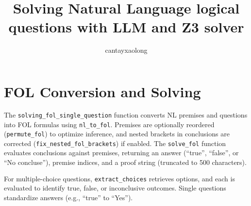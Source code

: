 \documentclass[11pt]{article}
\title{Solving Natural Language logical questions with LLM and Z3 solver}
\author{cantayxaolong}
\date{}
\begin{document}
\maketitle
\footnotesize

\section{FOL Conversion and Solving}
The \texttt{solving\_fol\_single\_question} function converts NL premises and questions into FOL formulas using \texttt{nl\_to\_fol}. Premises are optionally reordered (\texttt{permute\_fol}) to optimize inference, and nested brackets in conclusions are corrected (\texttt{fix\_nested\_fol\_brackets}) if enabled. The \texttt{solve\_fol} function evaluates conclusions against premises, returning an answer (``true'', ``false'', or ``No concluse''), premise indices, and a proof string (truncated to 500 characters).

For multiple-choice questions, \texttt{extract\_choices} retrieves options, and each is evaluated to identify true, false, or inconclusive outcomes. Single questions standardize answers (e.g., ``true'' to ``Yes'').
\end{document}
